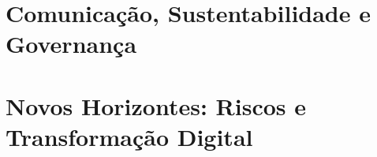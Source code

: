 \documentclass[12pt,a4paper]{abntex2}
\begin{document}




\part{Comunicação, Sustentabilidade e Governança}







\part{Novos Horizontes: Riscos e Transformação Digital}






\newpage





\appendix



\end{document}
